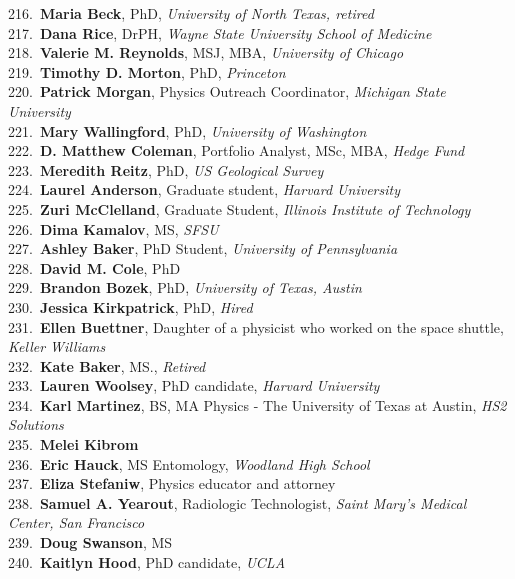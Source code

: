 216.~{\bf Maria Beck}, PhD, {\sl University of North Texas, retired} \\
217.~{\bf Dana Rice}, DrPH, {\sl Wayne State University School of Medicine} \\
218.~{\bf Valerie M. Reynolds}, MSJ, MBA, {\sl University of Chicago} \\
219.~{\bf Timothy D. Morton}, PhD, {\sl Princeton} \\
220.~{\bf Patrick Morgan}, Physics Outreach Coordinator, {\sl Michigan State University} \\
221.~{\bf Mary Wallingford}, PhD, {\sl University of Washington} \\
222.~{\bf D. Matthew Coleman}, Portfolio Analyst, MSc, MBA, {\sl Hedge Fund} \\
223.~{\bf Meredith Reitz}, PhD, {\sl US Geological Survey } \\
224.~{\bf Laurel Anderson}, Graduate student, {\sl Harvard University} \\
225.~{\bf Zuri McClelland}, Graduate Student, {\sl Illinois Institute of Technology} \\
226.~{\bf Dima Kamalov}, MS, {\sl SFSU} \\
227.~{\bf Ashley Baker}, PhD Student, {\sl University of Pennsylvania} \\
228.~{\bf David M. Cole}, PhD \\
229.~{\bf Brandon Bozek}, PhD, {\sl University of Texas, Austin} \\
230.~{\bf Jessica Kirkpatrick}, PhD, {\sl Hired} \\
231.~{\bf Ellen Buettner}, Daughter of a physicist who worked on the space shuttle, {\sl Keller Williams} \\
232.~{\bf Kate Baker}, MS., {\sl Retired} \\
233.~{\bf Lauren Woolsey}, PhD candidate, {\sl Harvard University} \\
234.~{\bf Karl Martinez}, BS, MA Physics - The University of Texas at Austin, {\sl HS2 Solutions} \\
235.~{\bf Melei Kibrom} \\
236.~{\bf Eric Hauck}, MS Entomology, {\sl Woodland High School} \\
237.~{\bf Eliza Stefaniw}, Physics educator and attorney \\
238.~{\bf Samuel A. Yearout}, Radiologic Technologist, {\sl Saint Mary's Medical Center, San Francisco } \\
239.~{\bf Doug Swanson}, MS \\
240.~{\bf Kaitlyn Hood}, PhD candidate, {\sl UCLA} \\

